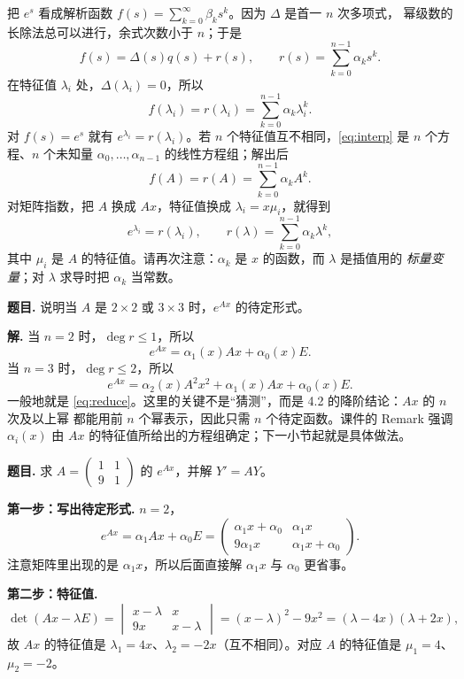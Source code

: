 \documentclass[11pt]{ctexart}
\newcommand{\pmat}[1]{\begin{pmatrix}#1\end{pmatrix}}
\newcommand{\Ax}{Ax}
\begin{document}
把 $e^{s}$ 看成解析函数 $f(s)=\sum_{k=0}^{\infty}\beta_ks^k$。因为 $\Delta$ 是首一 $n$ 次多项式，
幂级数的长除法总可以进行，余式次数小于 $n$；于是
\[
f(s)=\Delta(s)q(s)+r(s),\qquad r(s)=\sum_{k=0}^{n-1}\alpha_k s^k .
\]
在特征值 $\lambda_i$ 处，$\Delta(\lambda_i)=0$，所以
\begin{equation}\label{eq:interp}
f(\lambda_i)=r(\lambda_i)=\sum_{k=0}^{n-1}\alpha_k\lambda_i^k .
\end{equation}
对 $f(s)=e^s$ 就有 $e^{\lambda_i}=r(\lambda_i)$。若 $n$ 个特征值互不相同，\eqref{eq:interp} 是
$n$ 个方程、$n$ 个未知量 $\alpha_0,\dots,\alpha_{n-1}$ 的线性方程组；解出后
\[
f(A)=r(A)=\sum_{k=0}^{n-1}\alpha_kA^k .
\]
对矩阵指数，把 $A$ 换成 $\Ax$，特征值换成 $\lambda_i=x\mu_i$，就得到
\begin{equation}\label{eq:eigenEq}
e^{\lambda_i}=r(\lambda_i),\qquad
r(\lambda)=\sum_{k=0}^{n-1}\alpha_k\lambda^k,
\end{equation}
其中 $\mu_i$ 是 $A$ 的特征值。请再次注意：$\alpha_k$ 是 $x$ 的函数，而 $\lambda$ 是插值用的
\emph{标量变量}；对 $\lambda$ 求导时把 $\alpha_k$ 当常数。


\textbf{题目.} 说明当 $A$ 是 $2\times2$ 或 $3\times3$ 时，$e^{Ax}$ 的待定形式。

\textbf{解.} 当 $n=2$ 时，$\deg r\le1$，所以
\[
e^{Ax}=\alpha_1(x)\Ax+\alpha_0(x)E .
\]
当 $n=3$ 时，$\deg r\le2$，所以
\[
e^{Ax}=\alpha_2(x)A^2x^2+\alpha_1(x)\Ax+\alpha_0(x)E .
\]
一般地就是 \eqref{eq:reduce}。这里的关键不是“猜测”，而是 4.2 的降阶结论：$\Ax$ 的 $n$ 次及以上幂
都能用前 $n$ 个幂表示，因此只需 $n$ 个待定函数。课件的 Remark 强调 $\alpha_i(x)$ 由
$\Ax$ 的特征值所给出的方程组确定；下一小节起就是具体做法。


\textbf{题目.} 求 $A=\pmat{1&1\\9&1}$ 的 $e^{Ax}$，并解 $Y'=AY$。

\textbf{第一步：写出待定形式.} $n=2$，
\[
e^{Ax}=\alpha_1\Ax+\alpha_0E
=\pmat{\alpha_1x+\alpha_0&\alpha_1x\\9\alpha_1x&\alpha_1x+\alpha_0}.
\]
注意矩阵里出现的是 $\alpha_1x$，所以后面直接解 $\alpha_1x$ 与 $\alpha_0$ 更省事。

\textbf{第二步：特征值.}
\[
\det(\Ax-\lambda E)
=\begin{vmatrix}x-\lambda&x\\9x&x-\lambda\end{vmatrix}
=(x-\lambda)^2-9x^2=(\lambda-4x)(\lambda+2x),
\]
故 $\Ax$ 的特征值是 $\lambda_1=4x$、$\lambda_2=-2x$（互不相同）。对应 $A$ 的特征值是 $\mu_1=4$、$\mu_2=-2$。
\end{document}
